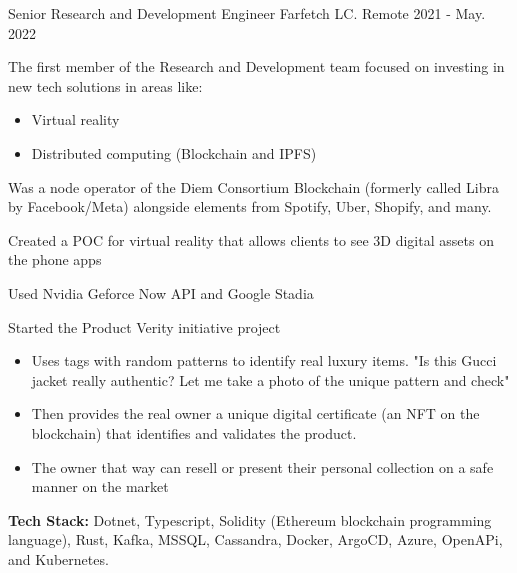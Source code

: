 \begin{cventries}
    \cventry
      {Senior Research and Development Engineer} %
      {Farfetch LC.} %
      {Remote} %
      {2021 - May. 2022} %
      {
        \begin{cvitems} %
          \item {The first member of the Research and Development team focused on investing in new tech solutions in areas like:}
          \begin{itemize}
           \item Virtual reality
           \item Distributed computing (Blockchain and IPFS)
          \end{itemize}
          \item {Was a node operator of the Diem Consortium Blockchain (formerly called Libra by Facebook/Meta) alongside elements from Spotify, Uber, Shopify, and many.}
          \item {Created a POC for virtual reality that allows clients to see 3D digital assets on the phone apps}
          \item {Used Nvidia Geforce Now API and Google Stadia}
          \item {Started the Product Verity initiative project}
          \begin{itemize}
           \item Uses tags with random patterns to identify real luxury items. "Is this Gucci jacket really authentic? Let me take a photo of the unique pattern and check"
           \item Then provides the real owner a unique digital certificate (an NFT on the blockchain) that identifies and validates the product.
           \item The owner that way can resell or present their personal collection on a safe manner on the market
          \end{itemize}
          \item {\textbf{Tech Stack:} Dotnet, Typescript, Solidity (Ethereum blockchain programming language), Rust, Kafka, MSSQL, Cassandra, Docker, ArgoCD, Azure, OpenAPi, and Kubernetes.}
        \end{cvitems}
      }
  

\end{cventries}
